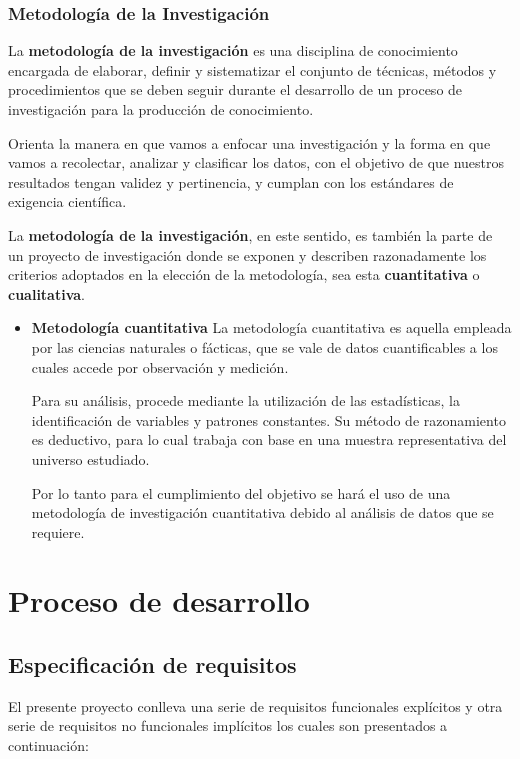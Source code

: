 \subsubsection{Metodología de la Investigación}

La \textbf{metodología de la investigación} es una disciplina de conocimiento encargada de elaborar, definir y sistematizar el conjunto de técnicas, métodos y procedimientos que se deben seguir durante el desarrollo de un proceso de investigación para la producción de conocimiento.

Orienta la manera en que vamos a enfocar una investigación y la forma en que vamos a recolectar, analizar y clasificar los datos, con el objetivo de que nuestros resultados tengan validez y pertinencia, y cumplan con los estándares de exigencia científica.

La \textbf{metodología de la investigación}, en este sentido, es también la parte de un proyecto de investigación donde se exponen y describen razonadamente los criterios adoptados en la elección de la metodología, sea esta \textbf{cuantitativa} o \textbf{cualitativa}.
\begin{itemize}
\item \textbf{Metodología cuantitativa}
La metodología cuantitativa es aquella empleada por las ciencias naturales o fácticas, que se vale de datos cuantificables a los cuales accede por observación y medición.

Para su análisis, procede mediante la utilización de las estadísticas, la identificación de variables y patrones constantes. Su método de razonamiento es deductivo, para lo cual trabaja con base en una muestra representativa del universo estudiado.

Por lo tanto para el cumplimiento del objetivo se hará el uso de una metodología de investigación cuantitativa  debido al análisis de datos que se requiere.

\end{itemize}

\section{Proceso de desarrollo}

\subsection{Especificación de requisitos}
El presente proyecto conlleva una serie de requisitos funcionales explícitos y otra serie de requisitos no funcionales implícitos los cuales son presentados a continuación:

